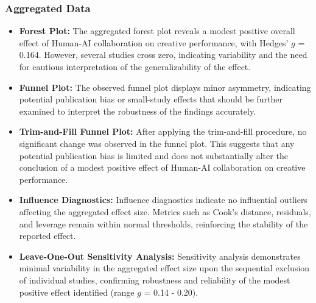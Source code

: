 \documentclass[manuscript, screen, review, acmsmall, anonymous]{acmart}
\begin{document}
\subsubsection{Aggregated Data}
\begin{itemize}
  \item \textbf{Forest Plot:} The aggregated forest plot reveals a modest positive overall effect of Human-AI collaboration on creative performance, with Hedges' $g$ = 0.164. However, several studies cross zero, indicating variability and the need for cautious interpretation of the generalizability of the effect.
  \item \textbf{Funnel Plot:} The observed funnel plot displays minor asymmetry, indicating potential publication bias or small-study effects that should be further examined to interpret the robustness of the findings accurately.
  \item \textbf{Trim-and-Fill Funnel Plot:} After applying the trim-and-fill procedure, no significant change was observed in the funnel plot. This suggests that any potential publication bias is limited and does not substantially alter the conclusion of a modest positive effect of Human-AI collaboration on creative performance.
  \item \textbf{Influence Diagnostics:} Influence diagnostics indicate no influential outliers affecting the aggregated effect size. Metrics such as Cook’s distance, residuals, and leverage remain within normal thresholds, reinforcing the stability of the reported effect.
  \item \textbf{Leave-One-Out Sensitivity Analysis:} Sensitivity analysis demonstrates minimal variability in the aggregated effect size upon the sequential exclusion of individual studies, confirming robustness and reliability of the modest positive effect identified (range $g$ = 0.14 - 0.20).
\end{itemize}
\end{document}
